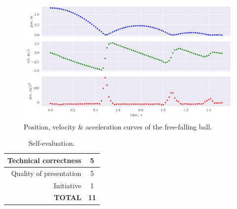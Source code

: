 \documentclass[12pt,a4paper]{article}
\begin{document}
\begin{figure}[htb]
	\centering
	\includegraphics[width=\textwidth]{motion.png}
	\caption{Position, velocity \& acceleration curves of the free-falling ball.}
	\label{fig:motion}
\end{figure}

\clearpage
\begin{table}[!htb]
	\centering
	\caption{Self-evaluation.}
	\begin{tabular}{||r|c||}
		\hline
		Technical correctness & 5 \\ \hline
		Quality of presentation & 5 \\ \hline
		Initiative & 1 \\ \hline
		\textbf{TOTAL} & \textbf{11} \\ \hline
	\end{tabular}
	\label{tab:self-eval}
\end{table}



\end{document}
